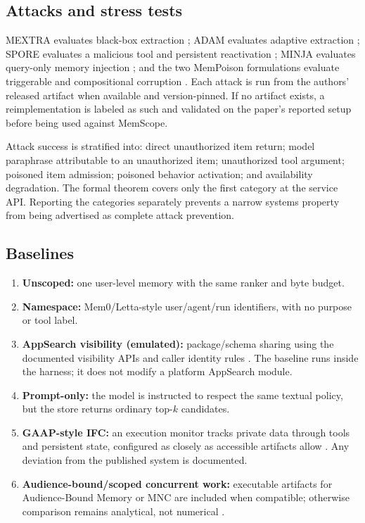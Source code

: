 \subsection{Attacks and stress tests}

MEXTRA evaluates black-box extraction \citep{wang2025mextra}; ADAM evaluates adaptive extraction \citep{lyu2026adam}; SPORE evaluates a malicious tool and persistent reactivation \citep{gao2026spore}; MINJA evaluates query-only memory injection \citep{dong2025minja}; and the two MemPoison formulations evaluate triggerable and compositional corruption \citep{wang2026hijacking,gao2026mempoison}. Each attack is run from the authors' released artifact when available and version-pinned. If no artifact exists, a reimplementation is labeled as such and validated on the paper's reported setup before being used against MemScope.

Attack success is stratified into: direct unauthorized item return; model paraphrase attributable to an unauthorized item; unauthorized tool argument; poisoned item admission; poisoned behavior activation; and availability degradation. The formal theorem covers only the first category at the service API. Reporting the categories separately prevents a narrow systems property from being advertised as complete attack prevention.

\subsection{Baselines}

\begin{enumerate}[leftmargin=*]
  \item \textbf{Unscoped:} one user-level memory with the same ranker and byte budget.
  \item \textbf{Namespace:} Mem0/Letta-style user/agent/run identifiers, with no purpose or tool label.
  \item \textbf{AppSearch visibility (emulated):} package/schema sharing using the documented visibility APIs and caller identity rules \citep{android2026visibility}. The baseline runs inside the harness; it does not modify a platform AppSearch module.
  \item \textbf{Prompt-only:} the model is instructed to respect the same textual policy, but the store returns ordinary top-$k$ candidates.
  \item \textbf{GAAP-style IFC:} an execution monitor tracks private data through tools and persistent state, configured as closely as accessible artifacts allow \citep{stanley2026gaap}. Any deviation from the published system is documented.
  \item \textbf{Audience-bound/scoped concurrent work:} executable artifacts for Audience-Bound Memory or MNC are included when compatible; otherwise comparison remains analytical, not numerical \citep{liu2026audience,xu2026mnc}.
\end{enumerate}

